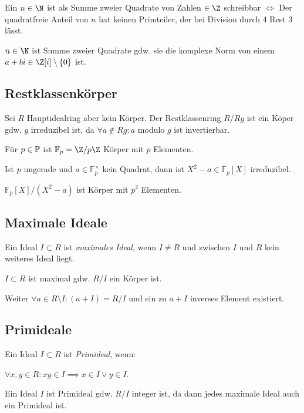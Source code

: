 Ein $n \in \N$ ist als Summe zweier Quadrate von Zahlen $\in \Z$ schreibbar $\iff$ Der quadratfreie Anteil von $n$ hat keinen Primteiler, der bei Division durch $4$ Rest $3$ lässt.

\spacing

$n \in \N$ ist Summe zweier Quadrate gdw. sie die komplexe Norm von einem $a + bi \in \Z[i] \setminus \{0\}$ ist.

\subsection*{Restklassenkörper}

Sei $R$ Hauptidealring aber kein Körper. Der Restklassenring $R/Rg$ ist ein Köper gdw. $g$ irreduzibel ist, da $\forall a \notin Rg : a$ modulo $g$ ist invertierbar.

\vspace*{1mm}

Für $p \in \mathbb{P}$ ist $\mathbb{F}_p = \Z/p\Z$ Körper mit $p$ Elementen.

\vspace*{1mm}

Ist $p$ ungerade und $a \in \mathbb{F}_p^\times$ kein Quadrat, dann ist $X^2 - a \in \mathbb{F}_p[X]$ irreduzibel.

$\mathbb{F}_p[X]/(X^2-a)$ ist Körper mit $p^2$ Elementen.

\subsection*{Maximale Ideale}

Ein Ideal $I \subset R$ ist \emph{maximales Ideal}, wenn $I \neq R$ und zwischen $I$ und $R$ kein weiteres Ideal liegt.

$I \subset R$ ist maximal gdw. $R/I$ ein Körper ist.

Weiter $\forall a \in R \setminus I : (a + I) = R/I$ und ein zu $a + I$ inverses Element existiert.

\subsection*{Primideale}

Ein Ideal $I \subset R$ ist \emph{Primideal}, wenn:

$\forall x, y \in R : xy \in I \implies x \in I \lor y \in I$.

\vspace*{1mm}

Ein Ideal $I$ ist Primideal gdw. $R/I$ integer ist, da dann jedes maximale Ideal auch ein Primideal ist.

